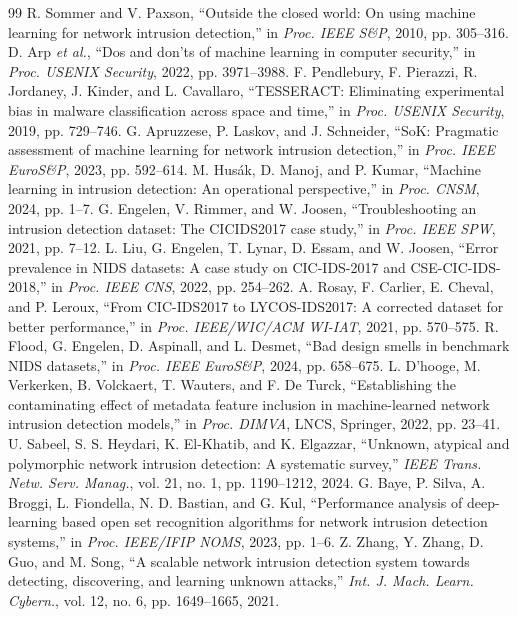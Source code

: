 \documentclass[conference]{IEEEtran}
\begin{document}
\begin{thebibliography}{99}
 R. Sommer and V. Paxson, ``Outside the closed world: On using machine learning for network intrusion detection,'' in \emph{Proc. IEEE S\&P}, 2010, pp. 305--316.
 D. Arp \emph{et al.}, ``Dos and don'ts of machine learning in computer security,'' in \emph{Proc. USENIX Security}, 2022, pp. 3971--3988.
 F. Pendlebury, F. Pierazzi, R. Jordaney, J. Kinder, and L. Cavallaro, ``TESSERACT: Eliminating experimental bias in malware classification across space and time,'' in \emph{Proc. USENIX Security}, 2019, pp. 729--746.
 G. Apruzzese, P. Laskov, and J. Schneider, ``SoK: Pragmatic assessment of machine learning for network intrusion detection,'' in \emph{Proc. IEEE EuroS\&P}, 2023, pp. 592--614.
 M. Hus\'ak, D. Manoj, and P. Kumar, ``Machine learning in intrusion detection: An operational perspective,'' in \emph{Proc. CNSM}, 2024, pp. 1--7.
 G. Engelen, V. Rimmer, and W. Joosen, ``Troubleshooting an intrusion detection dataset: The CICIDS2017 case study,'' in \emph{Proc. IEEE SPW}, 2021, pp. 7--12.
 L. Liu, G. Engelen, T. Lynar, D. Essam, and W. Joosen, ``Error prevalence in NIDS datasets: A case study on CIC-IDS-2017 and CSE-CIC-IDS-2018,'' in \emph{Proc. IEEE CNS}, 2022, pp. 254--262.
 A. Rosay, F. Carlier, E. Cheval, and P. Leroux, ``From CIC-IDS2017 to LYCOS-IDS2017: A corrected dataset for better performance,'' in \emph{Proc. IEEE/WIC/ACM WI-IAT}, 2021, pp. 570--575.
 R. Flood, G. Engelen, D. Aspinall, and L. Desmet, ``Bad design smells in benchmark NIDS datasets,'' in \emph{Proc. IEEE EuroS\&P}, 2024, pp. 658--675.
 L. D'hooge, M. Verkerken, B. Volckaert, T. Wauters, and F. De Turck, ``Establishing the contaminating effect of metadata feature inclusion in machine-learned network intrusion detection models,'' in \emph{Proc. DIMVA}, LNCS, Springer, 2022, pp. 23--41.
 U. Sabeel, S. S. Heydari, K. El-Khatib, and K. Elgazzar, ``Unknown, atypical and polymorphic network intrusion detection: A systematic survey,'' \emph{IEEE Trans. Netw. Serv. Manag.}, vol. 21, no. 1, pp. 1190--1212, 2024.
 G. Baye, P. Silva, A. Broggi, L. Fiondella, N. D. Bastian, and G. Kul, ``Performance analysis of deep-learning based open set recognition algorithms for network intrusion detection systems,'' in \emph{Proc. IEEE/IFIP NOMS}, 2023, pp. 1--6.
 Z. Zhang, Y. Zhang, D. Guo, and M. Song, ``A scalable network intrusion detection system towards detecting, discovering, and learning unknown attacks,'' \emph{Int. J. Mach. Learn. Cybern.}, vol. 12, no. 6, pp. 1649--1665, 2021.

\end{thebibliography}
\end{document}
